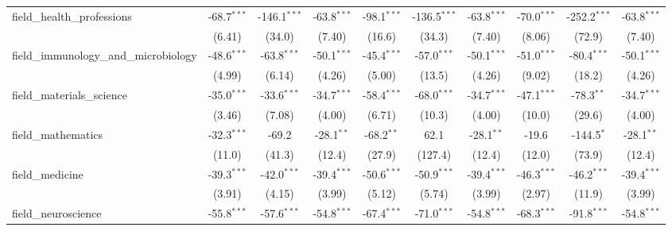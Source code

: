 \begin{tabular}{lccccccccc}
   field\_health\_professions                                  & -68.7$^{***}$ & -146.1$^{***}$ & -63.8$^{***}$ & -98.1$^{***}$  & -136.5$^{***}$ & -63.8$^{***}$ & -70.0$^{***}$  & -252.2$^{***}$ & -63.8$^{***}$\\   
                                                               & (6.41)        & (34.0)         & (7.40)        & (16.6)         & (34.3)         & (7.40)        & (8.06)         & (72.9)         & (7.40)\\   
   field\_immunology\_and\_microbiology                        & -48.6$^{***}$ & -63.8$^{***}$  & -50.1$^{***}$ & -45.4$^{***}$  & -57.0$^{***}$  & -50.1$^{***}$ & -51.0$^{***}$  & -80.4$^{***}$  & -50.1$^{***}$\\   
                                                               & (4.99)        & (6.14)         & (4.26)        & (5.00)         & (13.5)         & (4.26)        & (9.02)         & (18.2)         & (4.26)\\   
   field\_materials\_science                                   & -35.0$^{***}$ & -33.6$^{***}$  & -34.7$^{***}$ & -58.4$^{***}$  & -68.0$^{***}$  & -34.7$^{***}$ & -47.1$^{***}$  & -78.3$^{**}$   & -34.7$^{***}$\\   
                                                               & (3.46)        & (7.08)         & (4.00)        & (6.71)         & (10.3)         & (4.00)        & (10.0)         & (29.6)         & (4.00)\\   
   field\_mathematics                                          & -32.3$^{***}$ & -69.2          & -28.1$^{**}$  & -68.2$^{**}$   & 62.1           & -28.1$^{**}$  & -19.6          & -144.5$^{*}$   & -28.1$^{**}$\\   
                                                               & (11.0)        & (41.3)         & (12.4)        & (27.9)         & (127.4)        & (12.4)        & (12.0)         & (73.9)         & (12.4)\\   
   field\_medicine                                             & -39.3$^{***}$ & -42.0$^{***}$  & -39.4$^{***}$ & -50.6$^{***}$  & -50.9$^{***}$  & -39.4$^{***}$ & -46.3$^{***}$  & -46.2$^{***}$  & -39.4$^{***}$\\   
                                                               & (3.91)        & (4.15)         & (3.99)        & (5.12)         & (5.74)         & (3.99)        & (2.97)         & (11.9)         & (3.99)\\   
   field\_neuroscience                                         & -55.8$^{***}$ & -57.6$^{***}$  & -54.8$^{***}$ & -67.4$^{***}$  & -71.0$^{***}$  & -54.8$^{***}$ & -68.3$^{***}$  & -91.8$^{***}$  & -54.8$^{***}$\\   

\end{tabular}
